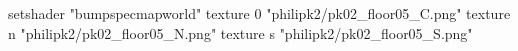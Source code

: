 setshader "bumpspecmapworld"
    texture 0 "philipk2/pk02_floor05_C.png"
    texture n "philipk2/pk02_floor05_N.png"
    texture s "philipk2/pk02_floor05_S.png"